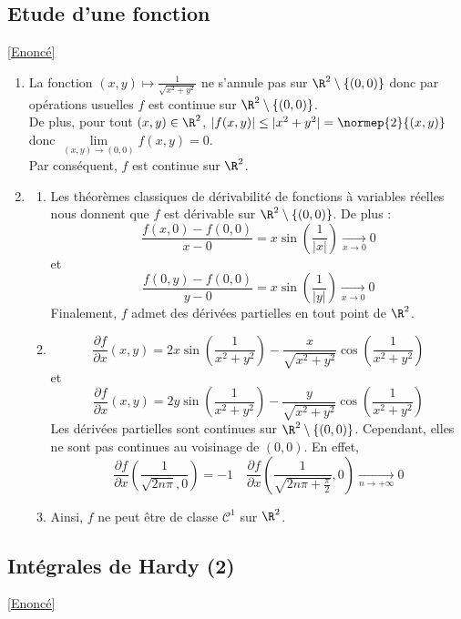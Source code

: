 \documentclass{book}
\begin{document}
	\subsection{Etude d'une fonction}
	\label{Etude d'une fonction corrigé}
	\textcolor{blue}{\hyperref[Etude d'une fonction]{[Enoncé]}}\\
	\begin{enumerate}
		\item La fonction $(x,y)\mapsto \frac{1}{\sqrt{x^2+y^2}}$ ne s'annule pas sur $\R^2\setminus\{(0,0)\}$ donc par opérations usuelles $f$ est continue sur $\R^2\setminus\{(0,0)\}$.\\
		De plus, pour tout $(x,y)\in\R^2$, $|f(x,y)|\leq |x^2+y^2|=\normep{2}{(x,y)}$ donc $\lim\limits_{(x,y)\to(0,0)} f(x,y)=0$.\\
		Par conséquent, $f$ est continue sur $\R^2$.
		\item \begin{enumerate}[label=\alph*.]
			\item Les théorèmes classiques de dérivabilité de fonctions à variables réelles nous donnent que $f$ est dérivable sur $\R^2\setminus\{(0,0)\}$. De plus : 
			\[\frac{f(x,0)-f(0,0)}{x-0}=x\sin\left(\frac{1}{|x|}\right)\underset{x\to 0}{\to} 0\]
			et 
			\[\frac{f(0,y)-f(0,0)}{y-0}=x\sin\left(\frac{1}{|y|}\right)\underset{x\to 0}{\to} 0\]
			Finalement, $f$ admet des dérivées partielles en tout point de $\R^2$.
			\item \[\frac{\partial f}{\partial x}(x,y)=2x\sin\left(\frac{1}{x^2+y^2}\right)-\frac{x}{\sqrt{x^2+y^2}}\cos\left(\frac{1}{x^2+y^2}\right)\]
			et 
			\[\frac{\partial f}{\partial x}(x,y)=2y\sin\left(\frac{1}{x^2+y^2}\right)-\frac{y}{\sqrt{x^2+y^2}}\cos\left(\frac{1}{x^2+y^2}\right)\]
			Les dérivées partielles sont continues sur $\R^2\setminus\{(0,0)\}$.
			Cependant, elles ne sont pas continues au voisinage de $(0,0)$. En effet, 
			\[\frac{\partial f}{\partial x}\left(\frac{1}{\sqrt{2n\pi},0}\right)=-1 \quad \frac{\partial f}{\partial x}\left(\frac{1}{\sqrt{2n\pi+\frac{\pi}{2}}},0\right)\underset{n\to+\infty}{\to}0\]
			\item Ainsi, $f$ ne peut être de classe $\mathcal{C}^1$ sur $\R^2$.
		\end{enumerate}
	\end{enumerate}
	
	\subsection{Intégrales de Hardy (2)}
	\label{Intégrales de Hardy (2) corrigé}
	\textcolor{blue}{\hyperref[Intégrales de Hardy (2)]{[Enoncé]}}\\
	
\end{document}
